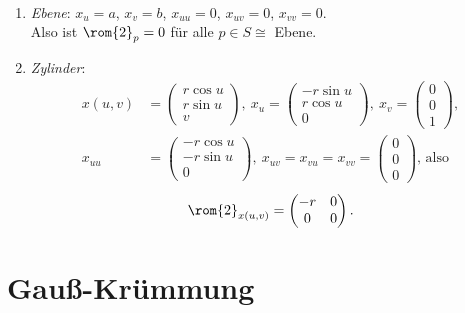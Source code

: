 \begin{example}
  \
  \begin{enumerate}
    \item \emph{Ebene}: \( x_u = a \), \( x_v = b \), \( x_{uu} = 0 \), \( x_{ uv } = 0 \), \( x_{ vv } = 0 \). \\
      Also ist \( \rom{2}_p = 0 \) für alle \( p \in S \cong \) Ebene.
    \item \emph{Zylinder}:
    \begin{align*}
      x(u,v) &= \left( \begin{smallmatrix}
        r\cos u \\ r\sin u \\ v
      \end{smallmatrix} \right), \ x_u = \left( \begin{smallmatrix}
        -r\sin u \\ r\cos u \\ 0
      \end{smallmatrix} \right), \ x_v = \left( \begin{smallmatrix}
        0 \\ 0 \\ 1
      \end{smallmatrix} \right), \\
      x_{uu} &= \left( \begin{smallmatrix}
        -r\cos u \\ -r\sin u \\ 0
      \end{smallmatrix} \right), \ x_{uv} = x_{vu} = x_{vv} = \left( \begin{smallmatrix}
         0 \\ 0 \\ 0
      \end{smallmatrix} \right)\text{, also}
    \end{align*}
    \begin{equation*}
      \rom{2}_{x(u,v)} = \begin{pmatrix}
        -r & 0 \\
        0 & 0
      \end{pmatrix}\text{.}
    \end{equation*}
  \end{enumerate}
\end{example}

\section{Gauß-Krümmung}

